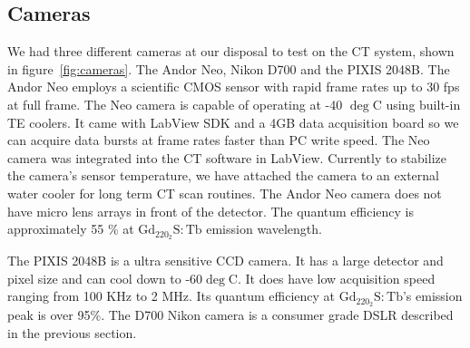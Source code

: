 \begin{figure}
\begin{floatrow}
\end{floatrow}

\end{figure}

\subsection{Cameras}
We had three different cameras at our disposal to test on the CT system, shown in figure~\ref{fig:cameras}.  The Andor Neo, Nikon D700 and the PIXIS 2048B.  The Andor Neo employs a scientific CMOS sensor with rapid frame rates up to 30 fps at full frame.  The Neo camera is capable of operating at -40 $\deg$C using built-in TE coolers.  It came with LabView SDK and a 4GB data acquisition board so we can acquire data bursts at frame rates faster than PC write speed.  The Neo camera was integrated into the CT software in LabView. Currently to stabilize the camera's sensor temperature, we have attached the camera to an external water cooler for long term CT scan routines.  The Andor Neo camera does not have micro lens arrays in front of the detector.  The quantum efficiency is approximately 55 \% at $\mathrm{Gd_220_2S:Tb}$ emission wavelength.


The PIXIS 2048B is a ultra sensitive CCD camera.  It has a large detector and pixel size and can cool down to -60$\deg$C.  It does have low acquisition speed ranging from 100 KHz to 2 MHz.  Its quantum efficiency at $\mathrm{Gd_220_2S:Tb}$'s emission peak is over 95\%. The D700 Nikon camera is a consumer grade DSLR described in the previous section.

